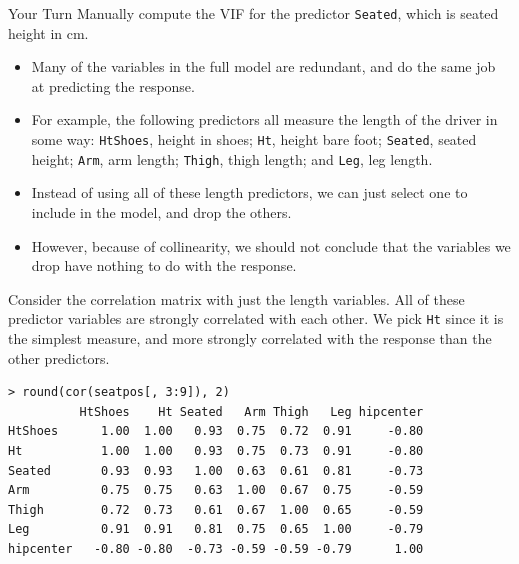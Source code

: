 \documentclass[10pt]{beamer}\usepackage[]{graphicx}\usepackage[]{color}
\begin{document}
\begin{frame}{Your Turn}
\large
Manually compute the VIF for the predictor \texttt{Seated}, which is seated height in cm.\\
\end{frame}

\begin{frame}
\begin{itemize}
\item Many of the variables in the full model are redundant, and do the same job at predicting the response.
\vspace{5pt}
\item For example, the following predictors all measure the length of the driver in some way: \texttt{HtShoes}, height in shoes; \texttt{Ht}, height bare foot; \texttt{Seated}, seated height; \texttt{Arm}, arm length; \texttt{Thigh}, thigh length; and \texttt{Leg}, leg length.
\vspace{5pt}
\item Instead of using all of these length predictors, we can just select one to include in the model, and drop the others.
\vspace{5pt}
\item However, because of collinearity, we should not conclude that the variables we drop have nothing to do with the response.
\end{itemize}
\end{frame}

\begin{frame}[fragile]
Consider the correlation matrix with just the length variables.  All of these predictor variables are strongly correlated with each other.  We pick \texttt{Ht} since it is the simplest measure, and more strongly correlated with the response than the other predictors.
\small
\begin{verbatim}
> round(cor(seatpos[, 3:9]), 2)
          HtShoes    Ht Seated   Arm Thigh   Leg hipcenter
HtShoes      1.00  1.00   0.93  0.75  0.72  0.91     -0.80
Ht           1.00  1.00   0.93  0.75  0.73  0.91     -0.80
Seated       0.93  0.93   1.00  0.63  0.61  0.81     -0.73
Arm          0.75  0.75   0.63  1.00  0.67  0.75     -0.59
Thigh        0.72  0.73   0.61  0.67  1.00  0.65     -0.59
Leg          0.91  0.91   0.81  0.75  0.65  1.00     -0.79
hipcenter   -0.80 -0.80  -0.73 -0.59 -0.59 -0.79      1.00
\end{verbatim}
\end{frame}
\end{document}
